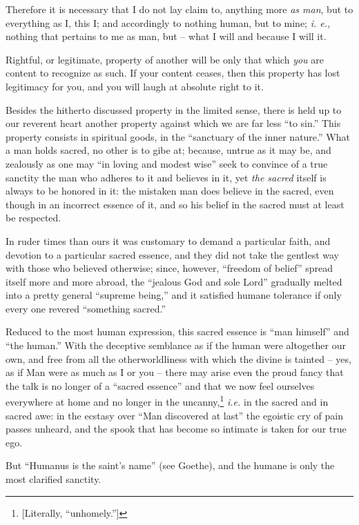 \documentclass[12pt,a4paper]{book}
\begin{document}
Therefore it is necessary that I do not lay claim to, anything more \textit{as 
man}, but to everything as I, this I; and accordingly to nothing human, but to 
mine; \textit{i. e.}, nothing that pertains to me as man, but -- what I will 
and because I will it.

Rightful, or legitimate, property of another will be only that which 
\textit{you} are content to recognize as such. If your content ceases, then 
this property has lost legitimacy for you, and you will laugh at absolute 
right to it.

Besides the hitherto discussed property in the limited sense, there is held up 
to our reverent heart another property against which we are far less ``to 
sin.'' This property consists in spiritual goods, in the ``sanctuary of the 
inner nature.'' What a man holds sacred, no other is to gibe at; because, 
untrue as it may be, and zealously as one may ``in loving and modest wise'' 
seek to convince of a true sanctity the man who adheres to it and believes in 
it, yet \textit{the sacred} itself is always to be honored in it: the mistaken 
man does believe in the sacred, even though in an incorrect essence of it, and 
so his belief in the sacred must at least be respected.

In ruder times than ours it was customary to demand a particular faith, and 
devotion to a particular sacred essence, and they did not take the gentlest 
way with those who believed otherwise; since, however, ``freedom of belief'' 
spread itself more and more abroad, the ``jealous God and sole Lord'' 
gradually melted into a pretty general ``supreme being,'' and it satisfied 
humane tolerance if only every one revered ``something sacred.''

Reduced to the most human expression, this sacred essence is ``man himself'' 
and ``the human.'' With the deceptive semblance as if the human were 
altogether our own, and free from all the otherworldliness with which the 
divine is tainted -- yes, as if Man were as much as I or you -- there may 
arise even the proud fancy that the talk is no longer of a ``sacred 
essence'' and that we now feel ourselves everywhere at home and no longer in 
the uncanny,\footnote{[Literally, ``unhomely.'']} \textit{i.e.} in the 
sacred and in sacred awe: in the ecstasy over ``Man discovered at last'' the 
egoistic cry of pain passes unheard, and the spook that has become so intimate 
is taken for our true ego.

But ``Humanus is the saint's name'' (see Goethe), and the humane is only the 
most clarified sanctity.
\end{document}
